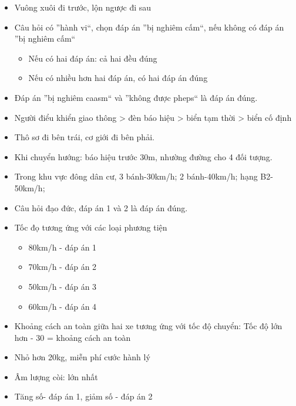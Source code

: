\documentclass{article}
\begin{document}
\begin{itemize}
\item Vuông xuôi đi trước, lộn ngược đi sau
\item Câu hỏi có ''hành vi``, chọn đáp án ''bị nghiêm cấm``, nếu không có đáp án ''bị nghiêm cấm``
\begin{itemize}
\item Nếu có hai đáp án: cả hai đều đúng
\item Nếu có nhiều hơn hai đáp án, có hai đáp án đúng
\end{itemize}
\item Đáp án ''bị nghiêm caasm`` và ''không được pheps`` là đáp án đúng.
\item Người điểu khiển giao thông > đèn báo hiệu > biển tạm thời > biển cố định
\item Thô sơ đi bên trái, cơ giới đi bên phải.
\item Khi chuyển hướng: báo hiệu trước 30m, nhường đường cho 4 đối tượng.
\item Trong khu vực đông dân cư, 3 bánh-30km/h; 2 bánh-40km/h; hạng B2-50km/h; 
\item Câu hỏi đạo đức, đáp án 1 và 2 là đáp án đúng.
\item Tốc đọ tương ứng với các loại phương tiện
\begin{itemize}
\item 80km/h - đáp án 1
\item 70km/h - đáp án 2
\item 50km/h - đáp án 3
\item 60km/h - đáp án 4
\end{itemize}
\item Khoảng cách an toàn giữa hai xe tương ứng với tốc độ  chuyển: Tốc độ lớn hơn - 30 = khoảng cách an toàn
\item Nhỏ hơn 20kg, miễn phí cước hành lý
\item Âm lượng còi: lớn nhất
\item Tăng số- đáp án 1, giảm số - đáp án 2
\end{itemize}
\end{document}
